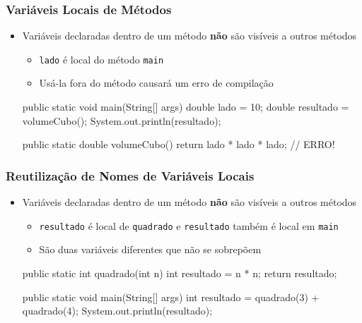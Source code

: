 \documentclass[xcolor={dvipsnames,table},aspectratio=169]{beamer}
\begin{document}
\begin{frame}[fragile]\frametitle{Variáveis Locais de Métodos}
\begin{itemize}
	\item Variáveis declaradas dentro de um método \textbf{não} são visíveis a outros métodos
	\begin{itemize}
		\item \texttt{lado} é local do método \texttt{main}
		\item Usá-la fora do método causará um erro de compilação
	\end{itemize}
\begin{javacode}
public static void main(String[] args) {
  double lado = 10;
  double resultado = volumeCubo();
  System.out.println(resultado);
}

public static double volumeCubo() {
  return lado * lado * lado; // ERRO!
}
\end{javacode}
\end{itemize}
\end{frame}

\begin{frame}[fragile]\frametitle{Reutilização de Nomes de Variáveis Locais}
\begin{itemize}
	\item Variáveis declaradas dentro de um método \textbf{não} são visíveis a outros métodos
	\begin{itemize}
		\item \texttt{resultado} é local de \texttt{quadrado} e \texttt{resultado} também é local em \texttt{main}
		\item São duas variáveis diferentes que não se sobrepõem
	\end{itemize}
\begin{javacode}
public static int quadrado(int n) {
  int resultado = n * n;
  return resultado;
}

public static void main(String[] args) {
  int resultado = quadrado(3) + quadrado(4);
  System.out.println(resultado);
}
\end{javacode}
\end{itemize}
\end{frame}
\end{document}
